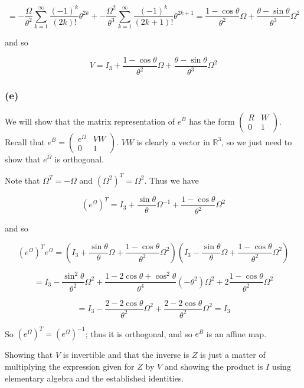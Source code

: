\documentclass{article}
\begin{document}
\[ = - \dfrac{\Omega}{\theta^2} \displaystyle\sum_{k=1}^{\infty} \dfrac{(-1)^k}{(2k)!} \theta^{2k} + - \dfrac{\Omega^2}{\theta^3} \displaystyle\sum_{k=1}^{\infty} \dfrac{(-1)^k}{(2k+1)!} \theta^{2k+1} = \dfrac{1-\cos \theta}{\theta^2} \Omega + \dfrac{\theta - \sin \theta}{\theta^3} \Omega^2\]

and so 

\[V = I_3 + \dfrac{1-\cos \theta}{\theta^2} \Omega + \dfrac{\theta - \sin \theta}{\theta^3} \Omega^2\]

\subsubsection{(e)}

We will show that the matrix representation of $e^B$ has the form $\left( \begin{array}{cc} R & W \\ 0 & 1 \end{array}\right)$. Recall that $e^B = \left(\begin{array}{cc} e^{\Omega} & VW \\ 0 & 1 \end{array}\right)$. $VW$ is clearly a vector in $\mathbb{R}^3$, so we just need to show that $e^{\Omega}$ is orthogonal. 

Note that $\Omega^T = -\Omega$ and $(\Omega^2)^T = \Omega^2$. Thus we have 

\[ (e^{\Omega})^T = I_3 + \dfrac{\sin \theta}{\theta} \Omega^{-1} + \dfrac{1 - \cos \theta}{\theta^2} \Omega^2 \]

and so 

\[ (e^{\Omega})^T e^{\Omega} = \left(I_3 + \dfrac{\sin \theta}{\theta} \Omega + \dfrac{1 - \cos \theta}{\theta^2} \Omega^2 \right) \left(I_3 - \dfrac{\sin \theta}{\theta} \Omega + \dfrac{1 - \cos \theta}{\theta^2} \Omega^2 \right) \]

\[ = I_3 - \dfrac{\sin^2 \theta}{\theta^2} \Omega^2 + \dfrac{1 - 2\cos \theta + \cos^2 \theta}{\theta^4} (-\theta^2) \Omega^2  + 2\dfrac{1 - \cos \theta}{\theta^2} \Omega^2\]

\[ = I_3 - \dfrac{2 - 2 \cos \theta}{\theta^2} \Omega^2 + \dfrac{2 - 2 \cos \theta}{\theta^2} \Omega^2 = I_3\]

So $(e^{\Omega})^T = (e^{\Omega})^{-1}$; thus it is orthogonal, and so $e^B$ is an affine map. 

Showing that $V$ is invertible and that the inverse is $Z$ is just a matter of multiplying the expression given for $Z$ by $V$ and showing the product is $I$ using elementary algebra and the established identities. 
\end{document}
